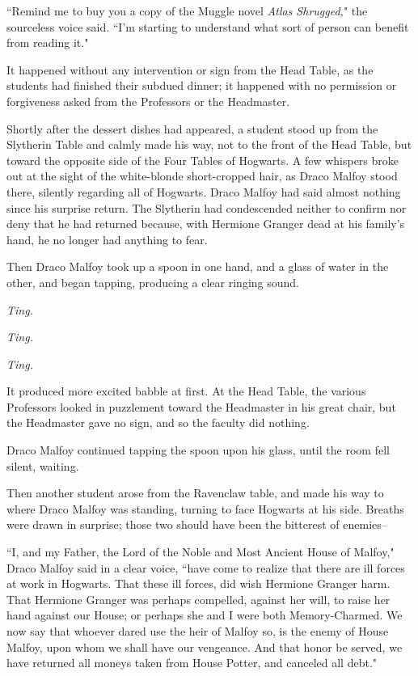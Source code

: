 ``Remind me to buy you a copy of the Muggle novel \emph{Atlas Shrugged,}" the sourceless voice said. ``I'm starting to understand what sort of person can benefit from reading it."


It happened without any intervention or sign from the Head Table, as the students had finished their subdued dinner; it happened with no permission or forgiveness asked from the Professors or the Headmaster.

Shortly after the dessert dishes had appeared, a student stood up from the Slytherin Table and calmly made his way, not to the front of the Head Table, but toward the opposite side of the Four Tables of Hogwarts. A few whispers broke out at the sight of the white-blonde short-cropped hair, as Draco Malfoy stood there, silently regarding all of Hogwarts. Draco Malfoy had said almost nothing since his surprise return. The Slytherin had condescended neither to confirm nor deny that he had returned because, with Hermione Granger dead at his family's hand, he no longer had anything to fear.

Then Draco Malfoy took up a spoon in one hand, and a glass of water in the other, and began tapping, producing a clear ringing sound.

\emph{Ting.}

\emph{Ting.}

\emph{Ting.}

It produced more excited babble at first. At the Head Table, the various Professors looked in puzzlement toward the Headmaster in his great chair, but the Headmaster gave no sign, and so the faculty did nothing.

Draco Malfoy continued tapping the spoon upon his glass, until the room fell silent, waiting.

Then another student arose from the Ravenclaw table, and made his way to where Draco Malfoy was standing, turning to face Hogwarts at his side. Breaths were drawn in surprise; those two should have been the bitterest of enemies\---

``I, and my Father, the Lord of the Noble and Most Ancient House of Malfoy," Draco Malfoy said in a clear voice, ``have come to realize that there are ill forces at work in Hogwarts. That these ill forces, did wish Hermione Granger harm. That Hermione Granger was perhaps compelled, against her will, to raise her hand against our House; or perhaps she and I were both Memory-Charmed. We now say that whoever dared use the heir of Malfoy so, is the enemy of House Malfoy, upon whom we shall have our vengeance. And that honor be served, we have returned all moneys taken from House Potter, and canceled all debt."

